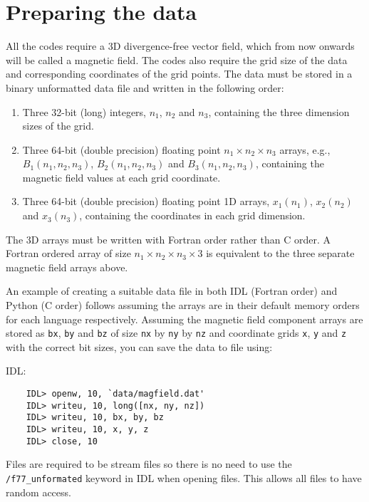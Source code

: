 \documentclass[12pt]{article}
\begin{document}
  \section{Preparing the data}
    \label{sec:prep_data}

    All the codes require a 3D divergence-free vector field, which from now onwards will be called a magnetic field. The codes also require the grid size of the data and corresponding coordinates of the grid points. The data must be stored in a binary unformatted data file and written in the following order:
    \begin{enumerate}
      \item Three 32-bit (long) integers, \( n_1 \), \( n_2 \) and \( n_3 \), containing the three dimension sizes of the grid.
      \item Three 64-bit (double precision) floating point \( n_1 \times n_2 \times n_3 \) arrays, e.g., \( B_1(n_1,n_2,n_3) \), \( B_2(n_1,n_2,n_3) \) and \( B_3(n_1,n_2,n_3) \), containing the magnetic field values at each grid coordinate.
      \item Three 64-bit (double precision) floating point 1D arrays, \( x_1(n_1) \), \( x_2(n_2) \) and \( x_3(n_3) \), containing the coordinates in each grid dimension.
    \end{enumerate}
    The 3D arrays must be written with Fortran order rather than C order. A Fortran ordered array of size \( n_1 \times n_2 \times n_3 \times 3 \) is equivalent to the three separate magnetic field arrays above.

    An example of creating a suitable data file in both IDL (Fortran order) and Python (C order) follows assuming the arrays are in their default memory orders for each language respectively. Assuming the magnetic field component arrays are stored as \texttt{bx}, \texttt{by} and \texttt{bz} of size \texttt{nx} by \texttt{ny} by \texttt{nz} and coordinate grids \texttt{x}, \texttt{y} and \texttt{z} with the correct bit sizes, you can save the data to file using:

    IDL:

    \begin{verbatim}
    IDL> openw, 10, `data/magfield.dat'
    IDL> writeu, 10, long([nx, ny, nz])
    IDL> writeu, 10, bx, by, bz
    IDL> writeu, 10, x, y, z
    IDL> close, 10
    \end{verbatim}
    Files are required to be stream files so there is no need to use the \texttt{/f77\_unformated} keyword in IDL when opening files. This allows all files to have random access.
\end{document}
